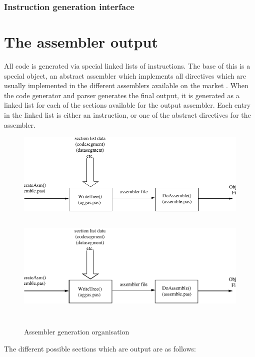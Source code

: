 \documentclass [12pt]{article}
\begin{document}
\subsubsection{Instruction generation interface}
\label{subsubsec:instruction}

\section{The assembler output}
\label{sec:mylabel8}

All code is generated via special linked lists of instructions. The base of 
this is a special object, an abstract assembler which implements all 
directives which are usually implemented in the different assemblers 
available on the market . When the code generator and parser generates the 
final output, it is generated as a linked list for each of the sections 
available for the output assembler. Each entry in the linked list is either 
an instruction, or one of the abstract directives for the assembler. 

\begin{figure}
\ifpdf
\includegraphics{arch11.pdf}
\else
\includegraphics[width=5.67in,height=2.17in]{arch11.eps}
\fi
\label{fig11}
\caption{Assembler generation organisation}
\end{figure}

\clearpage

The different possible sections which are output are as follows:
\end{document}
